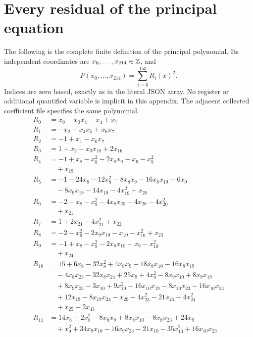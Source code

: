 \appendix
\section{Every residual of the principal equation}
\label{sec:residuals}
The following is the complete finite definition of the principal polynomial.
Its independent coordinates are $x_0,\ldots,x_{214}\in\mathbb Z$, and
\[P(x_0,\ldots,x_{214})=\sum_{i=0}^{153}R_i(x)^2.\]
Indices are zero based, exactly as in the literal JSON array. No register
or additional quantified variable is implicit in this appendix. The
adjacent collected coefficient file specifies the same polynomial.
\begingroup\small\setlength{\jot}{0.5pt}\allowdisplaybreaks[4]
\begin{align*}
R_{0}&=x_{0}-x_{0}x_{4}-x_{4}+x_{7}\\
R_{1}&=-x_{2}-x_{4}x_{5}+x_{6}x_{7}\\
R_{2}&=-1+x_{1}-x_{6}x_{7}\\
R_{3}&=1+x_{2}-x_{3}x_{18}+2x_{16}\\
R_{4}&=-1+x_{8}-x_{8}^{2}-2x_{8}x_{9}-x_{9}-x_{9}^{2}\\
&\quad{}+x_{19}\\
R_{5}&=-1-24x_{8}-12x_{8}^{2}-8x_{8}x_{9}-16x_{8}x_{19}-6x_{9}\\
&\quad{}-8x_{9}x_{19}-14x_{19}-4x_{19}^{2}+x_{20}\\
R_{6}&=-2-x_{8}-x_{8}^{2}-4x_{8}x_{20}-4x_{20}-4x_{20}^{2}\\
&\quad{}+x_{21}\\
R_{7}&=1+2x_{21}-4x_{21}^{2}+x_{22}\\
R_{8}&=-2-x_{9}^{2}-2x_{9}x_{10}-x_{10}-x_{10}^{2}+x_{23}\\
R_{9}&=-1+x_{8}-x_{8}^{2}-2x_{8}x_{10}-x_{9}-x_{10}^{2}\\
&\quad{}+x_{24}\\
R_{10}&=15+6x_{8}-32x_{8}^{2}+4x_{8}x_{9}-18x_{8}x_{10}-16x_{8}x_{19}\\
&\quad{}-4x_{8}x_{23}-32x_{8}x_{24}+25x_{9}+4x_{9}^{2}-8x_{9}x_{10}+8x_{9}x_{19}\\
&\quad{}+8x_{9}x_{23}-3x_{10}+9x_{10}^{2}-16x_{10}x_{19}-8x_{10}x_{23}-16x_{10}x_{24}\\
&\quad{}+12x_{19}-8x_{19}x_{24}-x_{20}+4x_{23}^{2}-21x_{24}-4x_{24}^{2}\\
&\quad{}+x_{25}-2x_{43}\\
R_{11}&=14x_{8}-2x_{8}^{2}-8x_{8}x_{9}+8x_{8}x_{10}-8x_{8}x_{23}+24x_{9}\\
&\quad{}+x_{9}^{2}+34x_{9}x_{10}-16x_{9}x_{23}-21x_{10}-35x_{10}^{2}+16x_{10}x_{23}\\

\end{align*}
